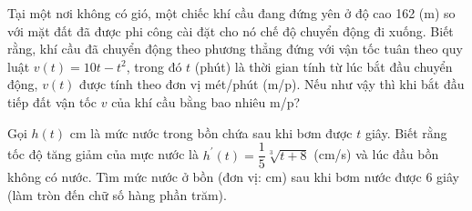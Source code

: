 \begin{bt}%

    Tại một nơi không có gió, một chiếc khí cầu đang đứng yên ở độ cao 162 (m) so với mặt đất đã được phi công cài đặt cho nó chế độ chuyển động đi xuống. Biết rằng, khí cầu đã chuyển động theo phương thẳng đứng với vận tốc tuân theo quy luật $v(t)=10 t-t^2$, trong đó $t$ (phút) là thời gian tính từ lúc bắt đầu chuyển động, $v(t)$ được tính theo đơn vị mét/phút (m/p). Nếu như vậy thì khi bắt đầu tiếp đất vận tốc $v$ của khí cầu bằng bao nhiêu m/p?
\end{bt}

\begin{bt}%

    Gọi $h(t)$ cm là mức nước trong bồn chứa sau khi bơm được $t$ giây. Biết rằng tốc độ tăng giảm của mực nước là $h^{\prime}(t)=\dfrac{1}{5} \sqrt[3]{t+8}$ (cm/s) và lúc đầu bồn không có nước. Tìm mức nước ở bồn (đơn vị: cm) sau khi bơm nước được $6$ giây (làm tròn đến chữ số hàng phần trăm).
\end{bt}

